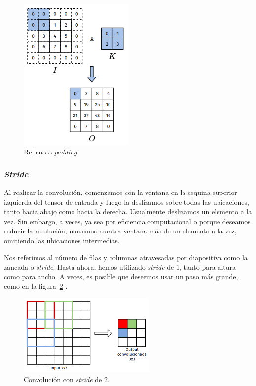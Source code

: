 \documentclass[a4paper,12pt]{article}
\begin{document}
\begin{figure}[H]
	\begin{center}				
		\includegraphics[width=0.50\textwidth]{conv-pad.png}
		\caption{Relleno o \textit{padding}.}
		\label{fig:padding}
	\end{center}
\end{figure}

\subsubsection{\textit{Stride}}

Al realizar la convolución, comenzamos con la ventana en la esquina superior izquierda del tensor de entrada y luego la deslizamos sobre todas las ubicaciones, tanto hacia abajo como hacia la derecha. Usualmente deslizamos un elemento a la vez. Sin embargo, a veces, ya sea por eficiencia computacional o porque deseamos reducir la resolución, movemos nuestra ventana más de un elemento a la vez, omitiendo las ubicaciones intermedias.

Nos referimos al número de filas y columnas atravesadas por diapositiva como la zancada o \textit{stride}. Hasta ahora, hemos utilizado \textit{stride} de 1, tanto para altura como para ancho. A veces, es posible que deseemos usar un paso más grande, como en la figura~\ref{fig:stride} \citep{Saha2020Oct}.

\begin{figure}[H]
	\begin{center}				
		\includegraphics[width=0.6\textwidth]{tesis_44.png}
		\caption{Convolución con \textit{stride} de 2.}
		\label{fig:stride}
	\end{center}
\end{figure}
\end{document}
